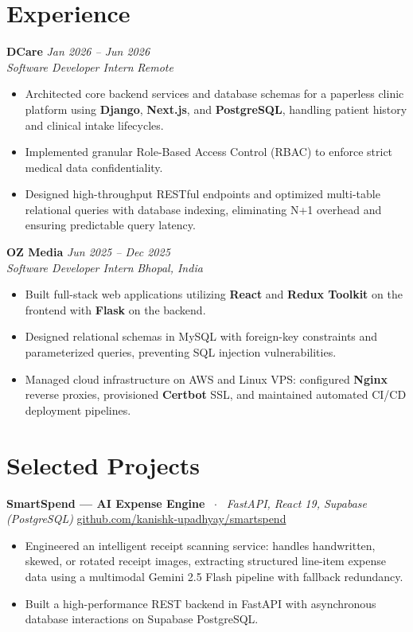 \documentclass[10pt,a4paper]{article}
\begin{document}
\section{Experience}
\textbf{DCare} \hfill \textit{Jan 2026 -- Jun 2026} \\
\textit{Software Developer Intern} \hfill \textit{Remote}
\begin{itemize}
    \item Architected core backend services and database schemas for a paperless clinic platform using \textbf{Django}, \textbf{Next.js}, and \textbf{PostgreSQL}, handling patient history and clinical intake lifecycles.
    \item Implemented granular Role-Based Access Control (RBAC) to enforce strict medical data confidentiality.
    \item Designed high-throughput RESTful endpoints and optimized multi-table relational queries with database indexing, eliminating N+1 overhead and ensuring predictable query latency.
\end{itemize}

\textbf{OZ Media} \hfill \textit{Jun 2025 -- Dec 2025} \\
\textit{Software Developer Intern} \hfill \textit{Bhopal, India}
\begin{itemize}
    \item Built full-stack web applications utilizing \textbf{React} and \textbf{Redux Toolkit} on the frontend with \textbf{Flask} on the backend.
    \item Designed relational schemas in MySQL with foreign-key constraints and parameterized queries, preventing SQL injection vulnerabilities.
    \item Managed cloud infrastructure on AWS and Linux VPS: configured \textbf{Nginx} reverse proxies, provisioned \textbf{Certbot} SSL, and maintained automated CI/CD deployment pipelines.
\end{itemize}

\section{Selected Projects}
\textbf{SmartSpend — AI Expense Engine} \ $\cdot$ \ \textit{FastAPI, React 19, Supabase (PostgreSQL)} \hfill \href{https://github.com/kanishk-upadhyay/smartspend}{github.com/kanishk-upadhyay/smartspend}
\begin{itemize}
    \item Engineered an intelligent receipt scanning service: handles handwritten, skewed, or rotated receipt images, extracting structured line-item expense data using a multimodal Gemini 2.5 Flash pipeline with fallback redundancy.
    \item Built a high-performance REST backend in FastAPI with asynchronous database interactions on Supabase PostgreSQL.
\end{itemize}
\end{document}
